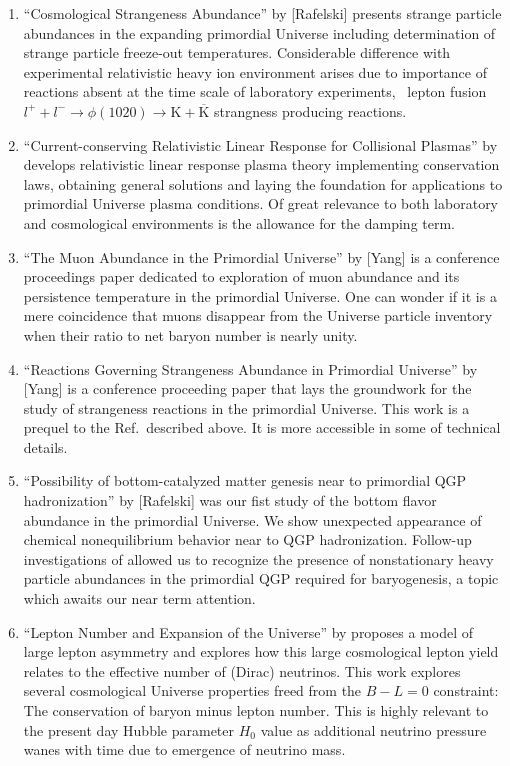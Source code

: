 \begin{enumerate}
%
\item ``Cosmological Strangeness Abundance'' by [Rafelski] presents strange particle abundances in the expanding primordial Universe including determination of strange particle freeze-out temperatures. {\color{black} Considerable difference with experimental relativistic heavy ion environment arises due to importance of reactions absent at the time scale of laboratory experiments, \eg\ lepton fusion $l^+ +l^-\to\phi(1020)\to \mathrm{K}+\overline{\mathrm K}$ strangness producing reactions.}
\item ``Current-conserving Relativistic Linear Response for Collisional Plasmas'' by  develops relativistic linear response plasma theory implementing conservation laws, obtaining general solutions and laying the foundation for applications to primordial Universe plasma conditions. {\color{black} Of great relevance to both laboratory and cosmological environments is the allowance for the damping term.}
%
\item ``The Muon Abundance in the Primordial Universe'' by [Yang] is a conference proceedings paper dedicated to exploration of muon abundance and its persistence temperature in the primordial Universe. {\color{black} One can wonder if it is a mere coincidence that muons disappear from the Universe particle inventory when their ratio to net baryon number is nearly unity.}
%
\item ``Reactions Governing Strangeness Abundance in Primordial Universe'' by [Yang] is a conference proceeding paper that lays the groundwork for the study of strangeness reactions in the primordial Universe. {\color{black} This work is a prequel to the Ref.\,\cite{Yang:2021bko} described above. It is more accessible in some of technical details.}
%
\item ``Possibility of bottom-catalyzed matter genesis near to primordial QGP hadronization'' by [Rafelski] was our fist study of the bottom flavor abundance in the primordial Universe. {\color{black} We show unexpected appearance of chemical nonequilibrium behavior near to QGP hadronization. Follow-up investigations of allowed us to recognize the presence of nonstationary heavy particle abundances in the primordial QGP required for baryogenesis, a topic which awaits our near term attention.}
%
\item ``Lepton Number and Expansion of the Universe'' by  proposes a model of large lepton asymmetry and explores how this large cosmological lepton yield relates to the effective number of (Dirac) neutrinos. {\color{black} This work explores several cosmological Universe properties freed from the $B-L=0$ constraint: The conservation of baryon minus lepton number. This is highly relevant to the present day Hubble parameter $H_0$ value as additional neutrino pressure wanes with time due to emergence of neutrino mass.}

\end{enumerate}
